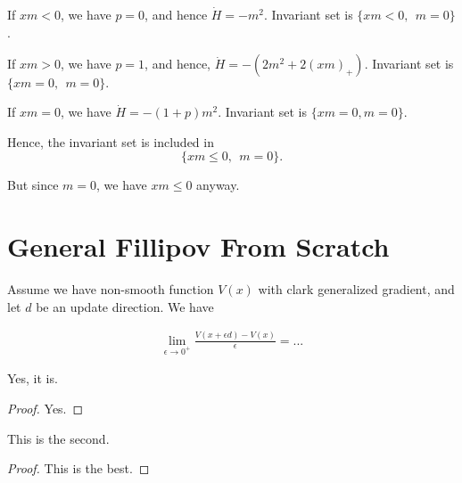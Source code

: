 \documentclass[11pt,letterpaper]{article}
\begin{document}
If $xm <0$, we have $p=0$, and hence $\dot H = - m^2$. 
Invariant set is $\{xm < 0, ~~ m=0\}$.

If $xm >0$, we have $p = 1$, and hence, $\dot H = -(2 m^2 + 2 (xm)_+)$. Invariant set is $\{xm=0, ~~ m=0\}.$

If $xm=0$, we have $\dot H = -(1+p) m^2$. Invariant set is $\{xm=0, m = 0\}$. 

Hence, the invariant set is included in 
$$
\{xm \leq 0, ~~ m = 0\}. 
$$

But since $m=0$, we have $xm\leq 0$ anyway. 


\section{General Fillipov From Scratch}

\begin{ctheorem}
Assume we have non-smooth function $V(x)$ with clark generalized gradient, and let $d$ be an update direction. We have 
\end{ctheorem} 
\begin{cproof} 
\begin{align*}
\lim_{\epsilon \to 0^+}\frac{V(x + \epsilon d) - V(x)}{\epsilon} 
= ... 
\end{align*}  
\end{cproof}   

\begin{thm}
    Yes, it is. 
\end{thm}
\begin{proof} 
    Yes. 
\end{proof}    

\begin{theorem}
    This is the second. 
\end{theorem}
\begin{proof}
    This is the best. 
\end{proof}     




 

\end{document}
